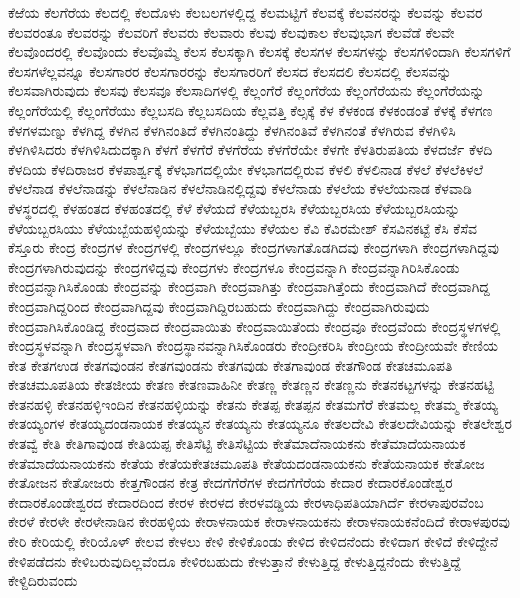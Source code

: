 {ಕೆಱೆಯ
ಕೆಲಗೆರೆಯ
ಕೆಲದಲ್ಲಿ
ಕೆಲದೊಳು
ಕೆಲಬಲಗಳಲ್ಲಿದ್ದ
ಕೆಲಮಟ್ಟಿಗೆ
ಕೆಲವಕ್ಕೆ
ಕೆಲವನರನ್ನು
ಕೆಲವನ್ನು
ಕೆಲವರ
ಕೆಲವರಂತೂ
ಕೆಲವರನ್ನು
ಕೆಲವರಿಗೆ
ಕೆಲವರು
ಕೆಲವಾರು
ಕೆಲವು
ಕೆಲವುಕಾಲ
ಕೆಲವುಭಾಗ
ಕೆಲವೆಡೆ
ಕೆಲವೇ
ಕೆಲವೊಂದರಲ್ಲಿ
ಕೆಲವೊಂದು
ಕೆಲವೊಮ್ಮೆ
ಕೆಲಸ
ಕೆಲಸಕ್ಕಾಗಿ
ಕೆಲಸಕ್ಕೆ
ಕೆಲಸಗಳ
ಕೆಲಸಗಳನ್ನು
ಕೆಲಸಗಳಿಂದಾಗಿ
ಕೆಲಸಗಳಿಗೆ
ಕೆಲಸಗಳೆಲ್ಲವನ್ನೂ
ಕೆಲಸಗಾರರ
ಕೆಲಸಗಾರರನ್ನು
ಕೆಲಸಗಾರರಿಗೆ
ಕೆಲಸದ
ಕೆಲಸದಲಿ
ಕೆಲಸದಲ್ಲಿ
ಕೆಲಸವನ್ನು
ಕೆಲಸವಾಗಿರುವುದು
ಕೆಲಸವು
ಕೆಲಸವೂ
ಕೆಲಸಾದಿಗಳಲ್ಲಿ
ಕೆಲ್ಲಂಗೆರೆ
ಕೆಲ್ಲಂಗೆರೆಯ
ಕೆಲ್ಲಂಗೆರೆಯನು
ಕೆಲ್ಲಂಗೆರೆಯನ್ನು
ಕೆಲ್ಲಂಗೆರೆಯಲ್ಲಿ
ಕೆಲ್ಲಂಗೆರೆಯು
ಕೆಲ್ಲಬಸದಿ
ಕೆಲ್ಲಬಸದಿಯ
ಕೆಲ್ಲವತ್ತಿ
ಕೆಲ್ಸಕ್ಕೆ
ಕೆಳ
ಕೆಳಕಂಡ
ಕೆಳಕಂಡಂತೆ
ಕೆಳಕ್ಕೆ
ಕೆಳಗಣ
ಕೆಳಗಳಮಣ್ನು
ಕೆಳಗಿದ್ದ
ಕೆಳಗಿನ
ಕೆಳಗಿನಂತಿದೆ
ಕೆಳಗಿನಂತಿದ್ದು
ಕೆಳಗಿನಂತಿವೆ
ಕೆಳಗಿನಂತೆ
ಕೆಳಗಿರುವ
ಕೆಳಗಿಳಿಸಿ
ಕೆಳಗಿಳಿಸಿದರು
ಕೆಳಗಿಳಿಸಿದುದಕ್ಕಾಗಿ
ಕೆಳಗೆ
ಕೆಳಗೆರೆ
ಕೆಳಗೆರೆಯ
ಕೆಳಗೆರೆಯೇ
ಕೆಳಗೇ
ಕೆಳತಿರುಪತಿಯ
ಕೆಳದರ್ಜೆ
ಕೆಳದಿ
ಕೆಳದಿಯ
ಕೆಳದಿರಾಜರ
ಕೆಳಪಾರ್ಶ್ವಕ್ಕೆ
ಕೆಳಭಾಗದಲ್ಲಿಯೇ
ಕೆಳಭಾಗದಲ್ಲಿರುವ
ಕೆಳಲಿ
ಕೆಳಲಿನಾಡ
ಕೆಳಲೆ
ಕೆಳಲೆಕಿಳಲೆ
ಕೆಳಲೆನಾಡ
ಕೆಳಲೆನಾಡನ್ನು
ಕೆಳಲೆನಾಡಿನ
ಕೆಳಲೆನಾಡಿನಲ್ಲಿದ್ದವು
ಕೆಳಲೆನಾಡು
ಕೆಳಲೆಯ
ಕೆಳಲೆಯನಾಡ
ಕೆಳವಾಡಿ
ಕೆಳಸ್ಥರದಲ್ಲಿ
ಕೆಳಹಂತದ
ಕೆಳಹಂತದಲ್ಲಿ
ಕೆಳೆ
ಕೆಳೆಯದೆ
ಕೆಳೆಯಬ್ಬರಸಿ
ಕೆಳೆಯಬ್ಬರಸಿಯ
ಕೆಳೆಯಬ್ಬರಸಿಯನ್ನು
ಕೆಳೆಯಬ್ಬರಸಿಯು
ಕೆಳೆಯಬ್ಬೆಯಹಳ್ಳಿಯನ್ನು
ಕೆಳೆಯಬ್ಬೆಯು
ಕೆಳೆಯಲ
ಕೆವಿ
ಕೆವಿರಮೇಶ್
ಕೆಸವಿನಕಟ್ಟೆ
ಕೆಸಿ
ಕೆಸೆವ
ಕೆಸ್ತೂರು
ಕೇಂದ್ರ
ಕೇಂದ್ರಗಳ
ಕೇಂದ್ರಗಳಲ್ಲಿ
ಕೇಂದ್ರಗಳಲ್ಲೂ
ಕೇಂದ್ರಗಳಾಗತೊಡಗಿದವು
ಕೇಂದ್ರಗಳಾಗಿ
ಕೇಂದ್ರಗಳಾಗಿದ್ದವು
ಕೇಂದ್ರಗಳಾಗಿರುವುದನ್ನು
ಕೇಂದ್ರಗಳಿದ್ದವು
ಕೇಂದ್ರಗಳು
ಕೇಂದ್ರಗಳೂ
ಕೇಂದ್ರವನ್ನಾಗಿ
ಕೇಂದ್ರವನ್ನಾಗಿರಿಸಿಕೊಂಡು
ಕೇಂದ್ರವನ್ನಾಗಿಸಿಕೊಂಡು
ಕೇಂದ್ರವನ್ನು
ಕೇಂದ್ರವಾಗಿ
ಕೇಂದ್ರವಾಗಿತ್ತು
ಕೇಂದ್ರವಾಗಿತ್ತೆಂದು
ಕೇಂದ್ರವಾಗಿದೆ
ಕೇಂದ್ರವಾಗಿದ್ದ
ಕೇಂದ್ರವಾಗಿದ್ದರಿಂದ
ಕೇಂದ್ರವಾಗಿದ್ದವು
ಕೇಂದ್ರವಾಗಿದ್ದಿರಬಹುದು
ಕೇಂದ್ರವಾಗಿದ್ದು
ಕೇಂದ್ರವಾಗಿರುವುದು
ಕೇಂದ್ರವಾಗಿಸಿಕೊಂಡಿದ್ದ
ಕೇಂದ್ರವಾದ
ಕೇಂದ್ರವಾಯಿತು
ಕೇಂದ್ರವಾಯಿತೆಂದು
ಕೇಂದ್ರವೂ
ಕೇಂದ್ರವೆಂದು
ಕೇಂದ್ರಸ್ಥಳಗಳಲ್ಲಿ
ಕೇಂದ್ರಸ್ಥಳವನ್ನಾಗಿ
ಕೇಂದ್ರಸ್ಥಳವಾಗಿ
ಕೇಂದ್ರಸ್ಥಾನವನ್ನಾಗಿಸಿಕೊಂಡರು
ಕೇಂದ್ರೀಕರಿಸಿ
ಕೇಂದ್ರೀಯ
ಕೇಂದ್ರೀಯವೇ
ಕೇಣಿಯ
ಕೇತ
ಕೇತಗಉಡ
ಕೇತಗವುಂಡನ
ಕೇತಗವುಂಡನು
ಕೇತಗವುಡು
ಕೇತಗಾವುಂಡ
ಕೇತಗೌಂಡ
ಕೇತಚಮೂಪತಿ
ಕೇತಚಮೂಪತಿಯ
ಕೇತಜೀಯ
ಕೇತಣ
ಕೇತಣವಾಹಿನೀ
ಕೇತಣ್ಣ
ಕೇತಣ್ಣನ
ಕೇತಣ್ಣನು
ಕೇತನಕಟ್ಟಗಳನ್ನು
ಕೇತನಹಟ್ಟಿ
ಕೇತನಹಳ್ಳಿ
ಕೇತನಹಳ್ಳಿಇಂದಿನ
ಕೇತನಹಳ್ಳಿಯನ್ನು
ಕೇತನು
ಕೇತಪ್ಪ
ಕೇತಪ್ಪನ
ಕೇತಮಗೆರೆ
ಕೇತಮಲ್ಲ
ಕೇತಮ್ಮ
ಕೇತಯ್ಯ
ಕೇತಯ್ಯಂಗಳ
ಕೇತಯ್ಯದಂಡನಾಯಕ
ಕೇತಯ್ಯನ
ಕೇತಯ್ಯನು
ಕೇತಯ್ಯನೂ
ಕೇತಲದೇವಿ
ಕೇತಲದೇವಿಯನ್ನು
ಕೇತಲೇಶ್ವರ
ಕೇತವ್ವೆ
ಕೇತಿ
ಕೇತಿಗಾವುಂಡ
ಕೇತಿಯಪ್ಪ
ಕೇತಿಸೆಟ್ಟಿ
ಕೇತಿಸೆಟ್ಟಿಯ
ಕೇತೆಮಾದೆನಾಯಕನು
ಕೇತೆಮಾದೆಯನಾಯಕ
ಕೇತೆಮಾದೆಯನಾಯಕನು
ಕೇತೆಯ
ಕೇತೆಯಕೇತಚಮೂಪತಿ
ಕೇತೆಯದಂಡನಾಯಕನು
ಕೇತೆಯನಾಯಕ
ಕೇತೋಜ
ಕೇತೋಜನ
ಕೇತೋಜರು
ಕೇತ್ತಗೌಂಡನ
ಕೇತ್ರ
ಕೇದಗೆಗೆರೆಗಳ
ಕೇದಗೆಗೆರೆಯ
ಕೇದಾರ
ಕೇದಾರಕೊಂಡೇಶ್ವರ
ಕೇದಾರಕೊಂಡೇಶ್ವರದ
ಕೇದಾರದಿಂದ
ಕೇರಳ
ಕೇರಳದ
ಕೇರಳವಡ್ಡಿಯ
ಕೇರಳಾಧಿಪತಿಯಾಗಿರ್ದೆ
ಕೇರಳಾಪುರವೆಂಬ
ಕೇರಳೆ
ಕೇರಳೇ
ಕೇರಳೇನಾಡಿನ
ಕೇರಹಳ್ಳಿಯ
ಕೇರಾಳನಾಯಕ
ಕೇರಾಳನಾಯಕನು
ಕೇರಾಳನಾಯಕನೆಂದಿದೆ
ಕೇರಾಳಪುರವು
ಕೇರಿ
ಕೇರಿಯಲ್ಲಿ
ಕೇರಿಯೊಳ್
ಕೇಲವ
ಕೇಳಲು
ಕೇಳಿ
ಕೇಳಿಕೊಂಡು
ಕೇಳಿದ
ಕೇಳಿದನೆಂದು
ಕೇಳಿದಾಗ
ಕೇಳಿದೆ
ಕೇಳಿದ್ದೇನೆ
ಕೇಳಿಪಡೆದನು
ಕೇಳಿಬರುವುದಿಲ್ಲವೆಂದೂ
ಕೇಳಿರಬಹುದು
ಕೇಳುತ್ತಾನೆ
ಕೇಳುತ್ತಿದ್ದ
ಕೇಳುತ್ತಿದ್ದನೆಂದು
ಕೇಳುತ್ತಿದ್ದೆ
ಕೇಳ್ದಿದಿರುವಂದು
}
